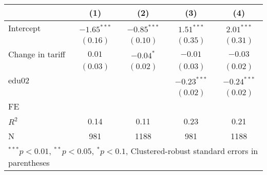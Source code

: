 
\begin{tabular}{l c c c c }
\hline
 & (1) & (2) & (3) & (4) \\
\hline
Intercept & $-1.65^{***}$ & $-0.85^{***}$ & $1.51^{***}$  & $2.01^{***}$  \\
            & $(0.16)$      & $(0.10)$      & $(0.35)$      & $(0.31)$      \\
Change in tariff     & $0.01$        & $-0.04^{*}$   & $-0.01$       & $-0.03$       \\
            & $(0.03)$      & $(0.02)$      & $(0.03)$      & $(0.02)$      \\
edu02       &               &               & $-0.23^{***}$ & $-0.24^{***}$ \\
            &               &               & $(0.02)$      & $(0.02)$      \\
\hline
FE          &                &                &                &                \\ 
\hline
$R^2$       & 0.14          & 0.11          & 0.23          & 0.21          \\
N           & 981           & 1188          & 981           & 1188          \\
\hline
\multicolumn{5}{l}{\scriptsize{$^{***}p<0.01$, $^{**}p<0.05$, $^*p<0.1$, Clustered-robust standard errors in parentheses}}
\end{tabular}
